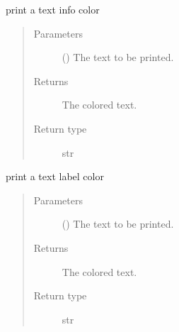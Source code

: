 \documentclass[a4paper,10pt,english]{sphinxmanual}
\begin{document}
\begin{fulllineitems}
\label{\detokenize{commands/apidoc/src:src.printcolors.printcInfo}}
print a text info color
\begin{quote}\begin{description}
\item[{Parameters}] \leavevmode
{} () \textendash{} The text to be printed.

\item[{Returns}] \leavevmode
The colored text.

\item[{Return type}] \leavevmode
str

\end{description}\end{quote}

\end{fulllineitems}


\begin{fulllineitems}
\label{\detokenize{commands/apidoc/src:src.printcolors.printcLabel}}
print a text label color
\begin{quote}\begin{description}
\item[{Parameters}] \leavevmode
{} () \textendash{} The text to be printed.

\item[{Returns}] \leavevmode
The colored text.

\item[{Return type}] \leavevmode
str

\end{description}\end{quote}

\end{fulllineitems}

\end{document}
